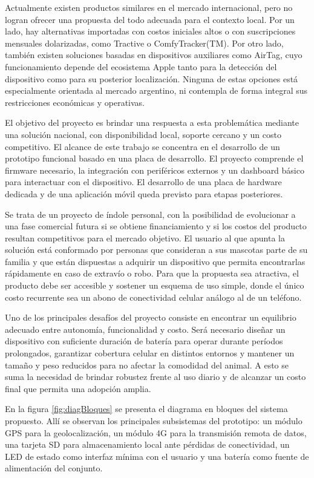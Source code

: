 \documentclass[
11pt, %
]{charter}
\begin{document}
Actualmente existen productos similares en el mercado internacional, pero no logran ofrecer una propuesta del todo adecuada para el contexto local. Por un lado, hay alternativas importadas con costos iniciales altos o con suscripciones mensuales dolarizadas, como Tractive o ComfyTracker(TM). Por otro lado, también existen soluciones basadas en dispositivos auxiliares como AirTag, cuyo funcionamiento depende del ecosistema Apple tanto para la detección del dispositivo como para su posterior localización. Ninguna de estas opciones está especialmente orientada al mercado argentino, ni contempla de forma integral sus restricciones económicas y operativas.

El objetivo del proyecto es brindar una respuesta a esta problemática mediante una solución nacional, con disponibilidad local, soporte cercano y un costo competitivo. El alcance de este trabajo se concentra en el desarrollo de un prototipo funcional basado en una placa de desarrollo. El proyecto comprende el firmware necesario, la integración con periféricos externos y un dashboard básico para interactuar con el dispositivo. El desarrollo de una placa de hardware dedicada y de una aplicación móvil queda previsto para etapas posteriores.

Se trata de un proyecto de índole personal, con la posibilidad de evolucionar a una fase comercial futura si se obtiene financiamiento y si los costos del producto resultan competitivos para el mercado objetivo. El usuario al que apunta la solución está conformado por personas que consideran a sus mascotas parte de su familia y que están dispuestas a adquirir un dispositivo que permita encontrarlas rápidamente en caso de extravío o robo. Para que la propuesta sea atractiva, el producto debe ser accesible y sostener un esquema de uso simple, donde el único costo recurrente sea un abono de conectividad celular análogo al de un teléfono.

Uno de los principales desafíos del proyecto consiste en encontrar un equilibrio adecuado entre autonomía, funcionalidad y costo. Será necesario diseñar un dispositivo con suficiente duración de batería para operar durante períodos prolongados, garantizar cobertura celular en distintos entornos y mantener un tamaño y peso reducidos para no afectar la comodidad del animal. A esto se suma la necesidad de brindar robustez frente al uso diario y de alcanzar un costo final que permita una adopción amplia.

En la figura \ref{fig:diagBloques} se presenta el diagrama en bloques del sistema propuesto. Allí se observan los principales subsistemas del prototipo: un módulo GPS para la geolocalización, un módulo 4G para la transmisión remota de datos, una tarjeta SD para almacenamiento local ante pérdidas de conectividad, un LED de estado como interfaz mínima con el usuario y una batería como fuente de alimentación del conjunto.
\end{document}
